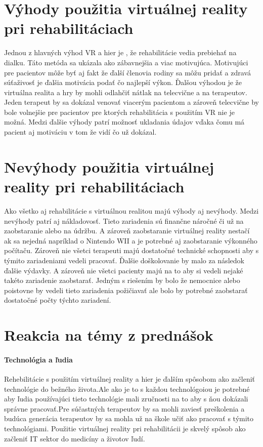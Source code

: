 \documentclass[10pt,twoside,slovak,a4paper]{article}
\begin{document}
\section{Výhody použitia virtuálnej reality pri rehabilitáciach} 

Jednou z hlavných výhod VR a hier je , že rehabilitácie vedia prebiehať na dialku. Táto metóda sa ukázala ako zábavnejšia a viac motivujúca. Motivujúci pre pacientov môže byť aj fakt že ďalší členovia rodiny sa môžu pridať a zdravá súťaživosť je ďalšia motivácia podať čo najlepší výkon. Ďalšou výhodou je že virtuálna realita a hry by mohli odlahčiť nátlak na telecvične a na terapeutov. Jeden terapeut by sa dokázal venovať viacerým pacientom a zároveň telecvične by bole volnejšie pre pacientov pre ktorých rehabilitácia s použitím VR nie je možná. Medzi ďalšie výhody patrí možnosť ukladania údajov vďaka čomu má pacient aj motiváciu v tom že vidí čo už dokázal.



\section{Nevýhody použitia virtuálnej reality pri rehabilitáciach}
Ako všetko aj rehabilitácie s virtuálnou realitou majú výhody aj nevýhody. Medzi nevýhody patrí aj nákladovosť. Tieto zariadenia sú finančne náročné či už na zaobstaranie alebo na údržbu. A zároveň zaobstaranie virtuálnej reality nestačí ak sa nejedná napríklad o Nintendo WII a je potrebné aj zaobstaranie výkonného počítaču. Zároveň nie všetci terapeuti majú dostatočné technické schopnosti aby s týmito zariadeniami vedeli pracovať. Ďalšie doškolovanie by malo za následok ďalšie výdavky.
A zároveň nie všetci pacienty majú na to aby si vedeli nejaké takéto zariadenie zaobstarať. Jedným s riešením by bolo že nemocnice alebo poistovne by vedeli tieto zariadenia požičiavať ale bolo by potrebné zaobstarať dostatočné počty týchto zariadení.


\section{Reakcia na témy z prednášok}
\paragraph{Technológia a ľudia}
Rehebilitácie s použitím virtuálnej reality a hier je ďalším spôsobom ako začleniť technológie do bežného života.Ale ako je to s každou technológoiou je potrebné aby ľudia používajúci tieto technológie mali zručnosti na to aby s ňou dokázali správne pracovať.Pre súčastných terapeutov by sa mohli zaviesť preškolenia a budúca generácia terapeutov by sa mohla už na škole učiť ako pracovať s týmito technológiami. Použitie virtuálnej reality pri rehabilitácii je skvelý spôsob ako začleniť IT sektor do medicíny a životov ľudí.
\end{document}
